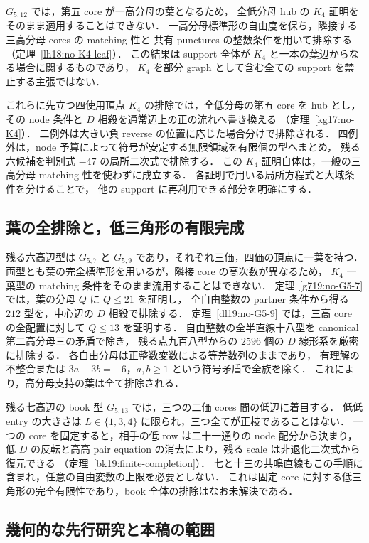 $G_{5,12}$ では，第五 core が一高分母の葉となるため，
全低分母 hub の $K_4$ 証明をそのまま適用することはできない．
一高分母標準形の自由度を保ち，隣接する三高分母 cores の matching 性と
共有 punctures の整数条件を用いて排除する
（定理~\ref{lh18:no-K4-leaf}）．
この結果は support 全体が $K_4$ と一本の葉辺からなる場合に関するものであり，
$K_4$ を部分 graph として含む全ての support を禁止する主張ではない．

これらに先立つ四使用頂点 $K_4$ の排除では，全低分母の第五 core を hub とし，
その node 条件と $D$ 相殺を通常辺上の正の流れへ書き換える
（定理~\ref{kg17:no-K4}）．
二例外は大きい負 reverse の位置に応じた場合分けで排除される．
四例外は，node 予算によって符号が安定する無限領域を有限個の型へまとめ，
残る六候補を判別式 $-47$ の局所二次式で排除する．
この $K_4$ 証明自体は，一般の三高分母 matching 性を使わずに成立する．
各証明で用いる局所方程式と大域条件を分けることで，
他の support に再利用できる部分を明確にする．

\subsection{葉の全排除と，低三角形の有限完成}

残る六高辺型は $G_{5,7}$ と $G_{5,9}$ であり，それぞれ三価，四価の頂点に一葉を持つ．
両型とも葉の完全標準形を用いるが，隣接 core の高次数が異なるため，
$K_4$ 一葉型の matching 条件をそのまま流用することはできない．
定理~\ref{g719:no-G5-7} では，葉の分母 $Q$ に $Q\le21$ を証明し，
全自由整数の partner 条件から得る $212$ 型を，中心辺の $D$ 相殺で排除する．
定理~\ref{dl19:no-G5-9} では，三高 core の全配置に対して $Q\le13$ を証明する．
自由整数の全半直線十八型を canonical 第二高分母三の矛盾で除き，
残る点九百八型からの $2596$ 個の $D$ 線形系を厳密に排除する．
各自由分母は正整数変数による等差数列のままであり，
有理解の不整合または $3a+3b=-6$，$a,b\ge1$ という符号矛盾で全族を除く．
これにより，高分母支持の葉は全て排除される．

残る七高辺の book 型 $G_{5,13}$ では，三つの二価 cores 間の低辺に着目する．
低低 entry の大きさは $L\in\{1,3,4\}$ に限られ，三つ全てが正枝であることはない．
一つの core を固定すると，相手の低 row は二十一通りの node 配分から決まり，
低 $D$ の反転と高高 pair equation の消去により，残る scale は非退化二次式から復元できる
（定理~\ref{bk19:finite-completion}）．
七と十三の共鳴直線もこの手順に含まれ，任意の自由変数の上限を必要としない．
これは固定 core に対する低三角形の完全有限性であり，book 全体の排除はなお未解決である．

\subsection{幾何的な先行研究と本稿の範囲}

